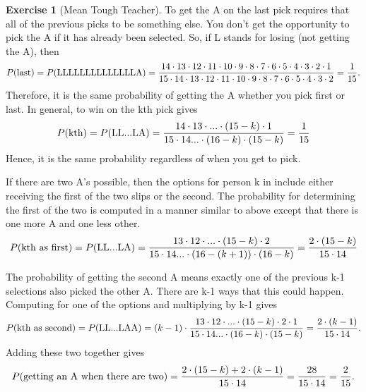 \documentclass[10pt,]{book}
\theoremstyle{plain}
\theoremstyle{definition}
\theoremstyle{definition}
\theoremstyle{definition}
\newtheorem{exercise}[theorem]{Exercise}
\numberwithin{equation}{section}
\begin{document}
\begin{exercise}[{Mean Tough Teacher}]
	To get the A on the last pick requires that all of the previous picks to be something else. You don't get the opportunity to pick the A if it has already been selected. So, if L stands for losing (not getting the A), then 
	\begin{equation*} P(\text{last}) = P(\text{LLLLLLLLLLLLLLA}) \\ = \frac{14 \cdot 13 \cdot 12 \cdot 11 \cdot 10 \cdot 9  \cdot 8  \cdot 7  \cdot 6  \cdot 5  \cdot 4  \cdot 3  \cdot 2  \cdot 1}{15 \cdot 14 \cdot 13 \cdot 12 \cdot 11 \cdot 10 \cdot 9 \cdot 8 \cdot 7 \cdot 6 \cdot 5 \cdot 4 \cdot 3 \cdot 2} = \frac{1}{15}.\end{equation*}
	Therefore, it is the same probability of getting the A whether you pick first or last.  In general, to win on the kth pick gives
	\begin{equation*} P(\text{kth}) = P(\text{LL...LA}) \\ = \frac{14 \cdot 13 \cdot ... \cdot (15-k)  \cdot 1}{15 \cdot 14 ... \cdot (16-k) \cdot (15-k)} = \frac{1}{15}\end{equation*}
	Hence, it is the same probability regardless of when you get to pick.
\par

	If there are two A's possible, then the options for person k in include either receiving the first of the two slips or the second. The probability for determining the first of the two is computed in a manner similar to above except that there is one more A and one less other.
	\begin{equation*} P(\text{kth as first}) = P(\text{LL...LA}) \\ = \frac{13 \cdot 12 \cdot ... \cdot (15-k)  \cdot 2}{15 \cdot 14 ... \cdot (16-(k+1)) \cdot (16-k)} = \frac{2 \cdot (15-k)}{15 \cdot 14}\end{equation*}

	The probability of getting the second A means exactly one of the previous k-1 selections also picked the other A. There are k-1 ways that this could happen. Computing for one of the options and multiplying by k-1 gives
	\begin{equation*} P(\text{kth as second}) = P(\text{LL...LAA}) \\ = (k-1) \cdot \frac{13 \cdot 12 \cdot ... \cdot (15-k) \cdot 2 \cdot 1}{15 \cdot 14 ... \cdot (16-k) \cdot (15-k)} = \frac{2 \cdot (k-1)}{15 \cdot 14}.\end{equation*}	
	Adding these two together gives
	\begin{equation*}P(\text{getting an A when there are two}) \\ = \frac{2 \cdot (15-k) + 2 \cdot (k-1)}{15 \cdot 14} = \frac{28}{15 \cdot 14} = \frac{2}{15}.\end{equation*}


\end{exercise}
\end{document}
